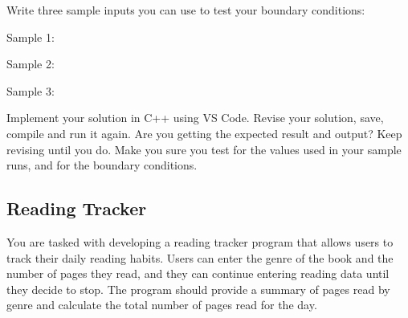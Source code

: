 \vspace{2cm}

\begin{multipart}
Write three sample inputs you can use to test your boundary conditions:
\end{multipart}
Sample 1:

\vspace{1.5cm}

Sample 2:

\vspace{1.5cm}

Sample 3:

\vspace{1.5cm}

\begin{multipart}
Implement your solution in C++ using VS Code. Revise your solution, save, compile and run it again. Are you getting the expected result and output? Keep revising until you do. Make you sure you test for the values used in your sample runs, and for the boundary conditions.
\end{multipart}

\subsection{Reading Tracker}
You are tasked with developing a reading tracker program that allows users to track their daily reading habits. Users can enter the genre of the book and the number of pages they read, and they can continue entering reading data until they decide to stop. The program should provide a summary of pages read by genre and calculate the total number of pages read for the day.


